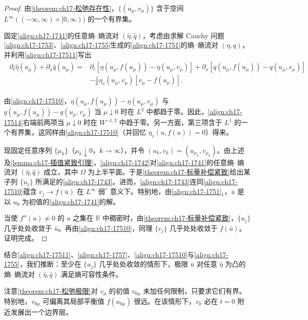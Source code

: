 \documentclass[../../main.tex]{subfiles}
\begin{document}
\begin{proof}
由\cref{theorem:ch17-松弛存在性}，$\{(u_\mu,v_\mu)\}$ 含于空间 $L^\infty((-\infty,\infty)\times[0,\infty))$ 的一个有界集。

固定\eqref{align:ch17-1741}的任意熵--熵流对 $(\hat\eta,\hat q)$，考虑由求解 Cauchy 问题\eqref{align:ch17-1753}、\eqref{align:ch17-1755}生成的\eqref{align:ch17-1751}的熵--熵流对 $(\eta,q)$，并利用\eqref{align:ch17-17511}写出
\begin{align}
\begin{split}
\partial_t\hat\eta(u_\mu)+\partial_x\hat q(u_\mu)
={}&\partial_t[\eta(u_\mu,f(u_\mu))-\eta(u_\mu,v_\mu)]+\partial_x[q(u_\mu,f(u_\mu))-q(u_\mu,v_\mu)]\\
&-\frac{1}{\mu}\eta_v(u_\mu,v_\mu)[v_\mu-f(u_\mu)].
\end{split}
\label{align:ch17-17514}
\end{align}

由\eqref{align:ch17-17510}，$\eta(u_\mu,f(u_\mu))-\eta(u_\mu,v_\mu)$ 与 $q(u_\mu,f(u_\mu))-q(u_\mu,v_\mu)$ 当 $\mu\downarrow0$ 时在 $L^2$ 中都趋于零。因此，\eqref{align:ch17-17514}右端前两项当 $\mu\downarrow0$ 时在 $W^{-1,2}$ 中趋于零。另一方面，第三项含于 $L^1$ 的一个有界集，这同样由\eqref{align:ch17-17510}（并回忆 $\eta_v(u,f(u))=0$）得来。

现固定任意序列 $\{\mu_k\}$（$\mu_k\downarrow0$，$k\to\infty$），并令 $(u_k,v_k)=(u_{\mu_k},v_{\mu_k})$。由上述及\cref{lemma:ch17-插值紧致引理}，\eqref{align:ch17-1742}对\eqref{align:ch17-1741}的任意熵--熵流对 $(\hat\eta,\hat q)$ 成立，其中 $\Omega$ 为上半平面。于是\cref{theorem:ch17-标量补偿紧致}给出某子列 $\{u_j\}$ 所满足的\eqref{align:ch17-1743}。进而，\eqref{align:ch17-1743}连同\eqref{align:ch17-17510}蕴含 $v_j\to f(\bar u)$ 在 $L^\infty$ 弱$^*$ 意义下。特别地，由\eqref{align:ch17-1751}$_1$，$\bar u$ 是以 $u_0$ 为初值的\eqref{align:ch17-1741}的解。

当使 $f''(u)\neq0$ 的 $u$ 之集在 $\mathbb{R}$ 中稠密时，由\cref{theorem:ch17-标量补偿紧致}，$\{u_j\}$ 几乎处处收敛于 $\bar u$。再由\eqref{align:ch17-17510}，同理 $\{v_j\}$ 几乎处处收敛于 $f(\bar u)$。证明完成。
\end{proof}

结合\eqref{align:ch17-17511}、\eqref{align:ch17-1757}、\eqref{align:ch17-17510}与\eqref{align:ch17-1755}，我们推断：至少在 $\{u_j\}$ 几乎处处收敛的情形下，极限 $\bar u$ 对任意 $\hat\eta$ 为凸的熵--熵流对 $(\hat\eta,\hat q)$ 满足熵可容性条件。

注意\cref{theorem:ch17-松弛极限}对 $v_\mu$ 的初值 $v_{0\mu}$ 未加任何限制，只要求它们有界。特别地，$v_{0\mu}$ 可偏离其局部平衡值 $f(u_{0\mu})$ 很远。在该情形下，$v_k$ 必在 $t=0$ 附近发展出一个边界层。
\end{document}
